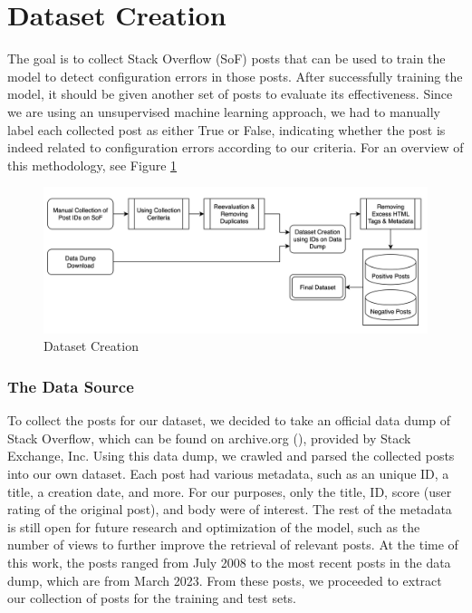 \documentclass[english,bachelor]{swsLeipzig}
\begin{document}
\section{Dataset Creation}
The goal is to collect Stack Overflow (SoF) posts that can be used to train the model to detect configuration errors 
in those posts. After successfully training the model, it should be given another set of posts to evaluate its effectiveness. Since we are using an unsupervised machine learning approach, we had to manually label each collected post as either True or False, indicating whether the post is indeed related to configuration errors according to our criteria. For an overview of this methodology, see Figure \ref{fig:figure41}

\begin{figure}[h]
  \includegraphics[width=1\textwidth]{images/figure1.png}
  \caption{Dataset Creation}
  \label{fig:figure41}
\end{figure}

\subsubsection{The Data Source}
To collect the posts for our dataset, we decided to take an official data dump of Stack Overflow, which can be found 
on archive.org (\citet{stackexchange:2023}), provided by Stack Exchange, Inc. Using this data dump, we crawled and parsed the collected posts into our own dataset. Each post had various metadata, such as an unique ID, a title, a creation date, and more. For our purposes, only the title, ID, score (user rating of the original post), and body were of interest. The rest of the metadata is still open for future research and optimization of the model, such as the number of views to further improve the retrieval of relevant posts. At the time of this work, the posts ranged from July 2008 to the most recent posts in the data dump, which are from March 2023. From these posts, we proceeded to extract our collection of posts for the training and test sets.
\end{document}
